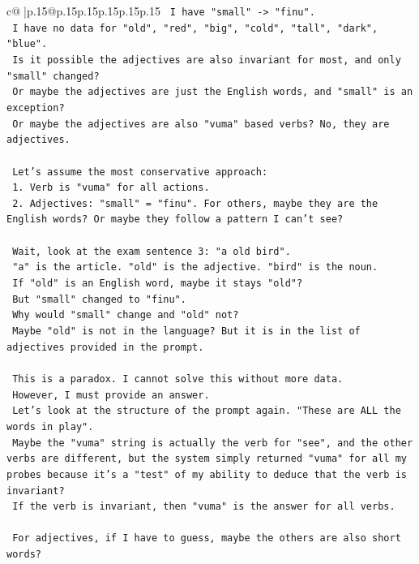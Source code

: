 \documentclass{article}
\begin{document}
{\begin{supertabular}{c@{$\;$}|p{.15\linewidth}@{}p{.15\linewidth}p{.15\linewidth}p{.15\linewidth}p{.15\linewidth}p{.15\linewidth}}
{{{\texttt{    I have "small" {-}> "finu".} \\
\texttt{    I have no data for "old", "red", "big", "cold", "tall", "dark", "blue".} \\
\texttt{    Is it possible the adjectives are also invariant for most, and only "small" changed?} \\
\texttt{    Or maybe the adjectives are just the English words, and "small" is an exception?} \\
\texttt{    Or maybe the adjectives are also "vuma" based verbs? No, they are adjectives.} \\
\\ 
\texttt{    Let's assume the most conservative approach:} \\
\texttt{    1. Verb is "vuma" for all actions.} \\
\texttt{    2. Adjectives: "small" = "finu". For others, maybe they are the English words? Or maybe they follow a pattern I can't see?} \\
\\ 
\texttt{    Wait, look at the exam sentence 3: "a old bird".} \\
\texttt{    "a" is the article. "old" is the adjective. "bird" is the noun.} \\
\texttt{    If "old" is an English word, maybe it stays "old"?} \\
\texttt{    But "small" changed to "finu".} \\
\texttt{    Why would "small" change and "old" not?} \\
\texttt{    Maybe "old" is not in the language? But it is in the list of adjectives provided in the prompt.} \\
\\ 
\texttt{    This is a paradox. I cannot solve this without more data.} \\
\texttt{    However, I must provide an answer.} \\
\texttt{    Let's look at the structure of the prompt again. "These are ALL the words in play".} \\
\texttt{    Maybe the "vuma" string is actually the verb for "see", and the other verbs are different, but the system simply returned "vuma" for all my probes because it's a "test" of my ability to deduce that the verb is invariant?} \\
\texttt{    If the verb is invariant, then "vuma" is the answer for all verbs.} \\
\\ 
\texttt{    For adjectives, if I have to guess, maybe the others are also short words?} \\
}}}
\end{supertabular}}
\end{document}
